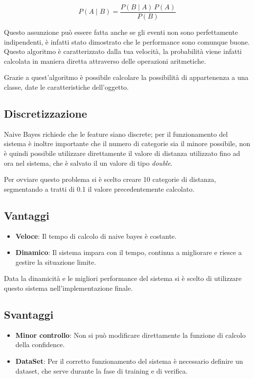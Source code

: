 \documentclass[twoside]{supsistudent}
\begin{document}
$$ P(A \mid B) = \frac{P(B \mid A) \, P(A)}{P(B)} $$

Questo assunzione può essere fatta anche se gli eventi non sono perfettamente indipendenti, è infatti stato dimostrato che le performance sono comunque buone. Questo algoritmo è caratterizzato dalla tua velocità, la probabilità viene infatti calcolata in maniera diretta attraverso delle operazioni aritmetiche.

Grazie a quest'algoritmo è possibile calcolare la possibilità di appartenenza a una classe, date le caratteristiche dell'oggetto.

\subsection{Discretizzazione}
Naive Bayes richiede che le feature siano discrete; per il funzionamento del sistema è inoltre importante che il numero di categorie sia il minore possibile, non è quindi possibile utilizzare direttamente il valore di distanza utilizzato fino ad ora nel sistema, che è salvato il un valore di tipo \textit{double}.

Per ovviare questo problema si è scelto creare 10 categorie di distanza, segmentando a tratti di 0.1 il valore precedentemente calcolato.
\subsection{Vantaggi}
\begin{itemize}
  \item \textbf{Veloce}: Il tempo di calcolo di naive bayes è costante.
  \item \textbf{Dinamico}: Il sistema impara con il tempo, continua a migliorare e riesce a gestire la situazione limite.
\end{itemize}
Data la dinamicità e le migliori performance del sistema si è scelto di utilizzare questo sistema nell'implementazione finale.
\subsection{Svantaggi}
\begin{itemize}
  \item \textbf{Minor controllo}: Non si può modificare direttamente la funzione di calcolo della confidence.
  \item \textbf{DataSet}: Per il corretto funzionamento del sistema è necessario definire un dataset, che serve durante la fase di training e di verifica.
\end{itemize}
\end{document}
